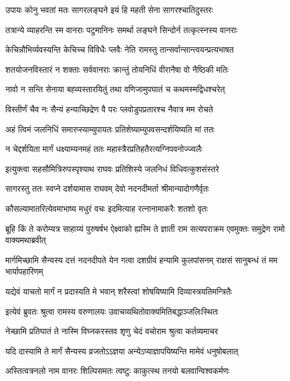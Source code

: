 \twolineshloka
{उपायः कोनु भवतां मतः सागरलङ्घने}
{इयं हि महती सेना सागरश्चातिदुस्तरः}


\twolineshloka
{तत्रान्ये व्याहरन्ति स्म वानराः पटुमानिनः}
{समर्था लङ्घने सिन्दोर्न तत्कृत्स्नस्य वानराः}


\twolineshloka
{केचिन्नौभिर्व्यवस्यन्ति केचिच्च विविधैः प्लवैः}
{नेति रामस्तु तान्सर्वान्सान्त्वयन्प्रत्यभाषत}


\twolineshloka
{शतयोजनविस्तारं न शक्ताः सर्ववानराः}
{क्रान्तुं तोयनिधिं वीरानैषा वो नैष्ठिकी मतिः}


\twolineshloka
{नावो न सन्ति सेनाया बह्व्यस्तारयितुं तथा}
{वणिजामुपघातं च कथमस्मद्विधश्चरेत्}


\twolineshloka
{विस्तीर्णं चैव नः सैन्यं हन्याच्छिद्रेण वै परः}
{प्लवोडुपप्रतारश्च नैवात्र मम रोचते}


\twolineshloka
{अहं त्विमं जलनिधिं समारप्स्याम्युपायतः}
{प्रतिशेष्याम्युपवसन्दर्शयिष्यति मां ततः}


\twolineshloka
{न चेद्दर्शयिता मार्गं धक्ष्याम्यनमहं ततः}
{महास्त्रैरप्रतिहतैरत्यग्निपवनोज्ज्वलैः}


\twolineshloka
{इत्युक्त्वा सहसौमित्रिरुपस्पृश्याथ राघवः}
{प्रतिशिस्ये जलनिधं विधिवत्कुशसंस्तरे}


\twolineshloka
{सागरस्तु ततः स्वप्ने दर्शयामास राघवम्}
{देवो नदनदीमर्ता श्रीमान्यादोगणैर्वृतः}


\twolineshloka
{कौसल्यामातरित्येवमाभाष्य मधुरं वचः}
{इदमित्याह रत्नानामाकरैः शतशो वृतः}


\threelineshloka
{ब्रूहि किं ते करोम्यत्र साहाय्यं पुरुषर्षभ}
{ऐक्ष्वाको ह्यस्मि ते ज्ञाती राम सत्यपराक्रम}
{एवमुक्तः समुद्रेण रामो वाक्यमथाब्रवीत्}


\threelineshloka
{मार्गमिच्छामि सैन्यस्य दत्तं नदनदीपते}
{येन गत्वा दशग्रीवं हन्यामि कुलपांसनम्}
{राक्षसं सानुबन्धं तं मम भार्यापहारिणम्}


\twolineshloka
{यद्येवं याचतो मार्गं न प्रदास्यति मे भवान्}
{शरैस्त्वां शोषयिष्यामि दिव्यास्त्रयतिमन्त्रितैः}


\twolineshloka
{इत्येवं ब्रुवतः श्रुत्वा रामस्य वरुणालयः}
{उवाचव्यथितोवाक्यमितिबद्धाञ्जलिःस्थितः}


\twolineshloka
{नेच्छामि प्रतिघातं ते नास्मि विघ्नकरस्तव}
{शृणु चेदं वचोराम श्रुत्वा कर्तव्यमाचर}


\twolineshloka
{यदि दास्यामि ते मार्गं सैन्यस्य व्रजतोऽऽज्ञया}
{अन्येऽप्याज्ञापयिष्यन्ति मामेवं धनुषोबलात्}


\twolineshloka
{अस्तित्वत्रनलो नाम वानरः शिल्पिसमतः}
{त्वष्टुः काकुत्स्थ तनयो बलवान्विश्वकर्मणः}



